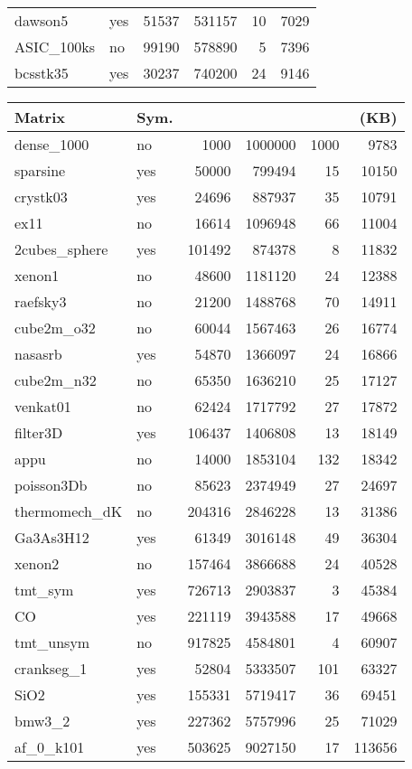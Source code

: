 \documentclass[11pt]{article}
\begin{document}
\begin{table}[!t]
{\begin{tabularx}{0.485\textwidth}{@{}ll@{\ \ }rrrr@{}}
dawson5 & yes & 51537 & 531157 & 10 & 7029 \\
ASIC\_100ks & no & 99190 & 578890 & 5 & 7396 \\
bcsstk35 & yes & 30237 & 740200 & 24 & 9146 \\
\bottomrule
\end{tabularx}
\hfill
\begin{tabularx}{0.485\textwidth}{@{}l@{\ \ }l@{\ \ }r@{\ \ }r@{\ \ }r@{\ \ }r@{}}
\toprule
Matrix & Sym. &  &  &  &  (KB)\\
\midrule
dense\_1000 & no & 1000 & 1000000 & 1000 & 9783 \\
sparsine & yes & 50000 & 799494 & 15 & 10150 \\
crystk03 & yes & 24696 & 887937 & 35 & 10791 \\
ex11 & no & 16614 & 1096948 & 66 & 11004 \\
2cubes\_sphere & yes & 101492 & 874378 & 8 & 11832 \\
xenon1 & no & 48600 & 1181120 & 24 & 12388 \\
raefsky3 & no & 21200 & 1488768 & 70 & 14911 \\
cube2m\_o32 & no & 60044 & 1567463 & 26 & 16774 \\
nasasrb & yes & 54870 & 1366097 & 24 & 16866 \\
cube2m\_n32 & no & 65350 & 1636210 & 25 & 17127 \\
venkat01 & no & 62424 & 1717792 & 27 & 17872 \\
filter3D & yes & 106437 & 1406808 & 13 & 18149 \\
appu & no & 14000 & 1853104 & 132 & 18342 \\
poisson3Db & no & 85623 & 2374949 & 27 & 24697 \\
thermomech\_dK & no & 204316 & 2846228 & 13 & 31386 \\
Ga3As3H12 & yes & 61349 & 3016148 & 49 & 36304 \\
xenon2 & no & 157464 & 3866688 & 24 & 40528 \\
tmt\_sym & yes & 726713 & 2903837 & 3 & 45384 \\
CO & yes & 221119 & 3943588 & 17 & 49668 \\
tmt\_unsym & no & 917825 & 4584801 & 4 & 60907 \\
crankseg\_1 & yes & 52804 & 5333507 & 101 & 63327 \\
SiO2 & yes & 155331 & 5719417 & 36 & 69451 \\
bmw3\_2 & yes & 227362 & 5757996 & 25 & 71029 \\
af\_0\_k101 & yes & 503625 & 9027150 & 17 & 113656 \\

\end{tabularx}}
\end{table}
\end{document}
